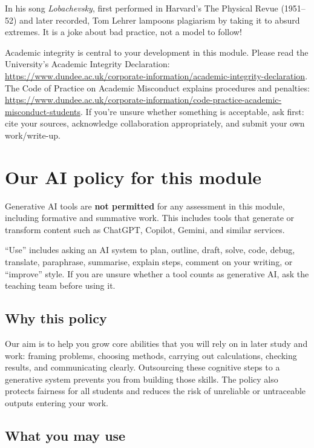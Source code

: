 \documentclass[
  a4paper,
  DIV=11,
  numbers=noendperiod,
  oneside]{scrreprt}
\begin{document}
In his song \emph{Lobachevsky}, first performed in Harvard's The
Physical Revue (1951--52) and later recorded, Tom Lehrer lampoons
plagiarism by taking it to absurd extremes. It is a joke about bad
practice, not a model to follow!

Academic integrity is central to your development in this module. Please
read the University's Academic Integrity Declaration:
\url{https://www.dundee.ac.uk/corporate-information/academic-integrity-declaration}.
The Code of Practice on Academic Misconduct explains procedures and
penalties:
\url{https://www.dundee.ac.uk/corporate-information/code-practice-academic-misconduct-students}.
If you're unsure whether something is acceptable, ask first: cite your
sources, acknowledge collaboration appropriately, and submit your own
work/write-up.

\section{Our AI policy for this
module}\label{our-ai-policy-for-this-module}

Generative AI tools are \textbf{not permitted} for any assessment in
this module, including formative and summative work. This includes tools
that generate or transform content such as ChatGPT, Copilot, Gemini, and
similar services.

``Use'' includes asking an AI system to plan, outline, draft, solve,
code, debug, translate, paraphrase, summarise, explain steps, comment on
your writing, or ``improve'' style. If you are unsure whether a tool
counts as generative AI, ask the teaching team before using it.

\subsection{Why this policy}\label{why-this-policy}

Our aim is to help you grow core abilities that you will rely on in
later study and work: framing problems, choosing methods, carrying out
calculations, checking results, and communicating clearly. Outsourcing
these cognitive steps to a generative system prevents you from building
those skills. The policy also protects fairness for all students and
reduces the risk of unreliable or untraceable outputs entering your
work.

\subsection{What you may use}\label{what-you-may-use}
\end{document}
